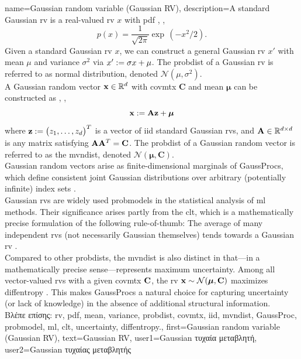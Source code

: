 {name={Gaussian random variable (Gaussian RV)},
	description={A  standard Gaussian \gls{rv} is a 
		real-valued \gls{rv} $x$ with \gls{pdf} \cite{BertsekasProb}, \cite{GrayProbBook}, \cite{papoulis}
		\begin{equation}
			\nonumber
			p(x) = \frac{1}{\sqrt{2\pi}} \exp\,(-x^2/2). 
		\end{equation}
		Given a standard Gaussian \gls{rv} $x$, we can construct a general Gaussian \gls{rv} $x'$ with 
		\gls{mean} $\mu$ and \gls{variance} $\sigma^2$ via $x' := \sigma x + \mu$. The \gls{probdist} of a 
		Gaussian \gls{rv} is referred to as normal distribution, denoted $\mathcal{N}(\mu, \sigma^2)$. 
		\\ 
		A Gaussian random vector ${\bf x} \in \mathbb{R}^{d}$ with 
		\gls{covmtx} $\mathbf{C}$ and \gls{mean} ${\bm \mu}$ can be constructed as \cite{GrayProbBook}, \cite{papoulis}, \cite{Lapidoth09}
		\[
		{\bf x} := \mathbf{A} {\bf z} + {\bm \mu}
		\]
		where ${\bf z} := \big( z_{1}, \ldots, z_{d} \big)^{T}$ is a vector of \gls{iid} standard Gaussian \gls{rv}s, 
		and ${\bf A} \in \mathbb{R}^{d \times d}$ is any matrix satisfying ${\bf A} {\bf A}^{T} = {\bf C}$. 
		The \gls{probdist} of a 
		Gaussian random vector is referred to as the \gls{mvndist}, denoted $\mathcal{N}({\bm \mu}, \mathbf{C})$.
		\\
		Gaussian random vectors arise as finite-dimensional marginals of \gls{GaussProc}s, which define 
		consistent joint Gaussian distributions over arbitrary (potentially infinite) index sets \cite{Rasmussen2006Gaussian}. 
  		\\
        		Gaussian \gls{rv}s are widely used \gls{probmodel}s in the statistical analysis of 
        		\gls{ml} methods. Their significance arises partly from the \gls{clt}, which is a mathematically 
        		precise formulation of the following rule-of-thumb: The average of many independent \glspl{rv} 
		(not necessarily Gaussian themselves) tends towards a Gaussian \gls{rv} \cite{ross2013first}.
		\\ 
		Compared to other \gls{probdist}s, the \gls{mvndist} is also distinct in that—in a mathematically 
		precise sense—represents maximum \gls{uncertainty}. Among all vector-valued \gls{rv}s with 
		a given \gls{covmtx} ${\bf C}$, the \gls{rv} ${\bf x} \sim \mathcal{N}({\bm \mu}, \mathbf{C})$ 
		maximizes \gls{diffentropy} \cite[Th. 8.6.5]{coverthomas}. This makes \gls{GaussProc}s a 
		natural choice for capturing \gls{uncertainty} (or lack of knowledge) in the absence of additional 
		structural information.
		\\
		\foreignlanguage{greek}{Βλέπε επίσης:} \gls{rv}, \gls{pdf}, \gls{mean}, \gls{variance}, \gls{probdist}, \gls{covmtx}, 
		\gls{iid}, \gls{mvndist}, \gls{GaussProc}, \gls{probmodel}, \gls{ml}, \gls{clt}, \gls{uncertainty}, \gls{diffentropy}.},
	first={Gaussian random variable (Gaussian RV)},
	text={Gaussian RV},
	user1={Gaussian \foreignlanguage{greek}{τυχαία μεταβλητή}}, %
	user2={Gaussian \foreignlanguage{greek}{τυχαίας μεταβλητής}} %
}

